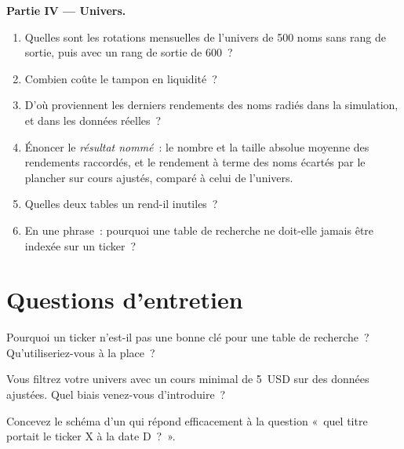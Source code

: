 \begin{problem}
\medskip\noindent\textbf{Partie IV --- Univers.}
\begin{enumerate}[resume]
\item Quelles sont les rotations mensuelles de l'univers de 500 noms sans rang de sortie, puis avec un rang de sortie de 600~?
\item Combien coûte le tampon en liquidité~?
\item D'où proviennent les derniers rendements des noms radiés dans la simulation, et dans les données réelles~?
\item Énoncer le \emph{résultat nommé}~: le nombre et la taille absolue moyenne des rendements raccordés, et le rendement à terme des noms écartés par le
plancher sur cours ajustés, comparé à celui de l'univers.
\item Quelles deux tables un  rend-il inutiles~?
\item En une phrase~: pourquoi une table de recherche ne doit-elle jamais être indexée sur un ticker~?
\end{enumerate}
\end{problem}

\section{Questions d'entretien}

\begin{interviewq}\label{iq:rs:universe-symbology-and-corporate-actions:1}
Pourquoi un ticker n'est-il pas une bonne clé pour une table de recherche~? Qu'utiliseriez-vous à la place~?
\end{interviewq}

\begin{interviewq}\label{iq:rs:universe-symbology-and-corporate-actions:2}
Vous filtrez votre univers avec un cours minimal de 5~USD sur des données ajustées. Quel biais venez-vous d'introduire~?
\end{interviewq}

\begin{interviewq}\label{iq:rs:universe-symbology-and-corporate-actions:3}
Concevez le schéma d'un  qui répond efficacement à la question «~quel titre portait le ticker X à la date D~?~».
\end{interviewq}

